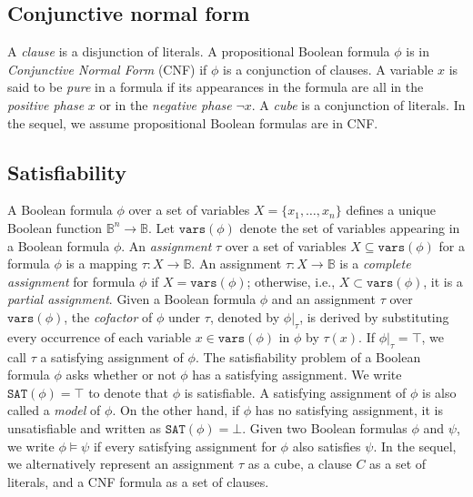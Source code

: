 \subsection{Conjunctive normal form}
A \emph{clause} is a disjunction of literals.
A propositional Boolean formula $\phi$ is in \emph{Conjunctive Normal Form} (CNF) if $\phi$ is a conjunction of clauses.
A variable $x$ is said to be \emph{pure} in a formula if its appearances in the formula are all in the \emph{positive phase} $x$ or in the \emph{negative phase} $\neg x$.
A \emph{cube} is a conjunction of literals.
In the sequel, we assume propositional Boolean formulas are in CNF.

\subsection{Satisfiability}
A Boolean formula $\phi$ over a set of variables $X=\{x_1, \ldots, x_n\}$ defines a unique Boolean function $\mathbb{B}^n \rightarrow \mathbb{B}$.
Let $\mathtt{vars}(\phi)$ denote the set of variables appearing in a Boolean formula $\phi$.
An \emph{assignment} $\tau$ over a set of variables $X \subseteq \mathtt{vars}(\phi)$ for a formula $\phi$ is a mapping $\tau: X \rightarrow \mathbb{B}$.
An assignment $\tau: X \rightarrow \mathbb{B}$ is a \emph{complete assignment} for formula $\phi$ if $X=\mathtt{vars}(\phi)$; otherwise, i.e., $X \subset \mathtt{vars}(\phi)$, it is a \emph{partial assignment}.
Given a Boolean formula $\phi$ and an assignment $\tau$ over $\mathtt{vars}(\phi)$, the \emph{cofactor} of $\phi$ under $\tau$, denoted by $\phi|_{\tau}$, is derived by substituting every occurrence of each variable $x \in \mathtt{vars}(\phi)$ in $\phi$ by $\tau(x)$.
If $\phi|_{\tau}=\top$, we call $\tau$ a satisfying assignment of $\phi$.
The satisfiability problem of a Boolean formula $\phi$ asks whether or not $\phi$ has a satisfying assignment.
We write $\mathtt{SAT}(\phi)=\top$ to denote that $\phi$ is satisfiable.
A satisfying assignment of $\phi$ is also called a \emph{model} of $\phi$.
On the other hand, if $\phi$ has no satisfying assignment, it is unsatisfiable and written as $\mathtt{SAT}(\phi)=\bot$.
Given two Boolean formulas $\phi$ and $\psi$, we write $\phi \models \psi$ if every satisfying assignment for $\phi$ also satisfies $\psi$.
In the sequel, we alternatively represent an assignment $\tau$ as a cube, a clause $C$ as a set of literals, and a CNF formula as a set of clauses.

